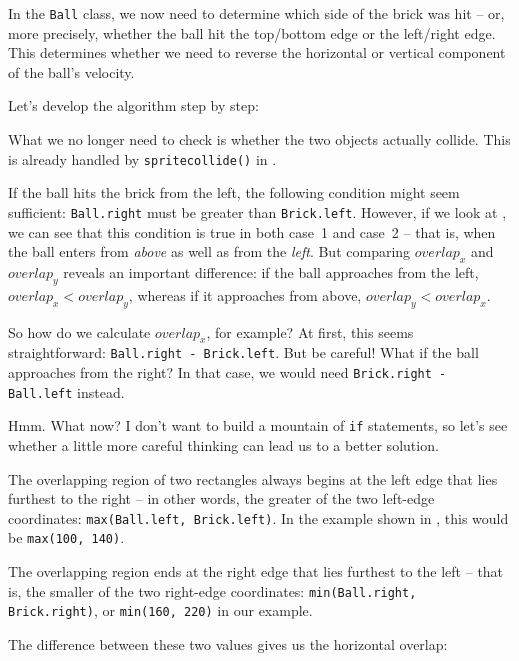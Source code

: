 \newpage
{}

In the \texttt{Ball} class, we now need to determine which side of the brick was hit -- or, more precisely, whether the ball hit the top/bottom edge or the left/right edge. This determines whether we need to reverse the horizontal or vertical component of the ball's velocity.

Let's develop the algorithm step by step:

What we no longer need to check is whether the two objects actually collide. This is already handled by \texttt{spritecollide()} in .

If the ball hits the brick from the left, the following condition might seem sufficient: \texttt{Ball.right} must be greater than \texttt{Brick.left}. However, if we look at , we can see that this condition is true in both case~1 and case~2 -- that is, when the ball enters from \emph{above} as well as from the \emph{left}. But comparing $overlap_x$ and $overlap_y$ reveals an important difference: if the ball approaches from the left, $overlap_x < overlap_y$, whereas if it approaches from above, $overlap_y < overlap_x$.

So how do we calculate $overlap_x$, for example? At first, this seems straightforward: \texttt{Ball.right - Brick.left}. But be careful! What if the ball approaches from the right? In that case, we would need \texttt{Brick.right - Ball.left} instead.

Hmm. What now? I don't want to build a mountain of \texttt{if} statements, so let's see whether a little more careful thinking can lead us to a better solution.

The overlapping region of two rectangles always begins at the left edge that lies furthest to the right -- in other words, the greater of the two left-edge coordinates: \texttt{max(Ball.left, Brick.left)}. In the example shown in , this would be \texttt{max(100, 140)}.

The overlapping region ends at the right edge that lies furthest to the left -- that is, the smaller of the two right-edge coordinates: \texttt{min(Ball.right, Brick.right)}, or \texttt{min(160, 220)} in our example.

The difference between these two values gives us the horizontal overlap:

